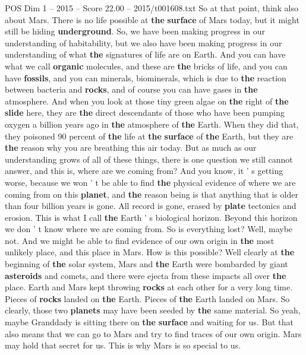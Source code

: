 \begin{textsample}{POS Dim 1 – 2015 – Score 22.00 – 2015/t001608.txt}
So at that point, think also about Mars.
There is no life possible at \textbf{the} \textbf{surface} of Mars today, but it might still be hiding \textbf{underground}.
So, we have been making progress in our understanding of habitability, but we also have been making progress in our understanding of what \textbf{the} signatures of life are on Earth.
And you can have what we call \textbf{organic} molecules, and these are \textbf{the} bricks of life, and you can have \textbf{fossils}, and you can minerals, biominerals, which is due to \textbf{the} reaction between bacteria and \textbf{rocks}, and of course you can have gases in \textbf{the} atmosphere.
And when you look at those tiny green algae on \textbf{the} right of \textbf{the} \textbf{slide} here, they are \textbf{the} direct descendants of those who have been pumping oxygen a billion years ago in \textbf{the} atmosphere of \textbf{the} Earth.
When they did that, they poisoned 90 percent of \textbf{the} life at \textbf{the} \textbf{surface} of \textbf{the} Earth, but they are \textbf{the} reason why you are breathing this air today.
But as much as our understanding grows of all of these things, there is one question we still cannot answer, and this is, where are we coming from?
And you know, it ' s getting worse, because we won ' t be able to find \textbf{the} physical evidence of where we are coming from on this \textbf{planet}, and \textbf{the} reason being is that anything that is older than four billion years is gone.
All record is gone, erased by \textbf{plate} tectonics and erosion.
This is what I call \textbf{the} Earth ' s biological horizon.
Beyond this horizon we don ' t know where we are coming from.
So is everything lost?
Well, maybe not.
And we might be able to find evidence of our own origin in \textbf{the} most unlikely place, and this place in Mars.
How is this possible?
Well clearly at \textbf{the} beginning of \textbf{the} solar system, Mars and \textbf{the} Earth were bombarded by giant \textbf{asteroids} and comets, and there were ejecta from these impacts all over \textbf{the} place.
Earth and Mars kept throwing \textbf{rocks} at each other for a very long time.
Pieces of \textbf{rocks} landed on \textbf{the} Earth.
Pieces of \textbf{the} Earth landed on Mars.
So clearly, those two \textbf{planets} may have been seeded by \textbf{the} same material.
So yeah, maybe Granddady is sitting there on \textbf{the} \textbf{surface} and waiting for us.
But that also means that we can go to Mars and try to find traces of our own origin.
Mars may hold that secret for us.
This is why Mars is so special to us.

\end{textsample}
